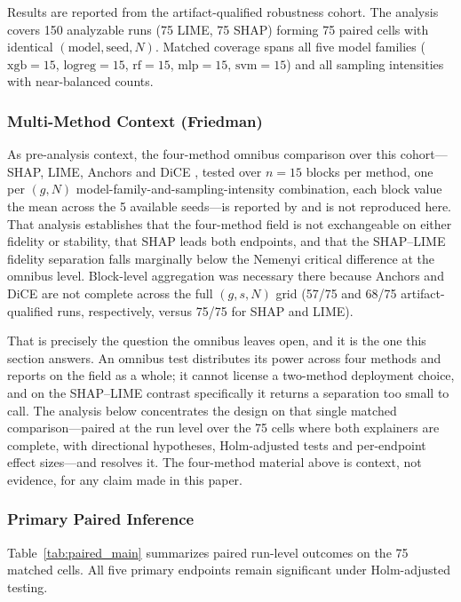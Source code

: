 \documentclass[fleqn,10pt,lineno]{wlpeerj}
\begin{document}
Results are reported from the artifact-qualified robustness cohort. The
analysis covers 150 analyzable runs (75 LIME, 75 SHAP) forming 75 paired
cells with identical $(\mathrm{model}, \mathrm{seed}, N)$. Matched
coverage spans all five model families ($\mathrm{xgb}=15$,
$\mathrm{logreg}=15$, $\mathrm{rf}=15$, $\mathrm{mlp}=15$,
$\mathrm{svm}=15$) and all sampling intensities with near-balanced counts.

\subsubsection*{Multi-Method Context (Friedman)}

As pre-analysis context, the four-method omnibus comparison over this
cohort---SHAP, LIME, Anchors \citep{ribeiro2018anchors} and DiCE
\citep{mothilal2020dice}, tested over $n=15$ blocks per method, one per
$(g,N)$ model-family-and-sampling-intensity combination, each block value
the mean across the 5 available seeds---is reported by
\citet{herrera2026framework} and is not reproduced here. That analysis
establishes that the four-method field is not exchangeable on either
fidelity or stability, that SHAP leads both endpoints, and that the
SHAP--LIME fidelity separation falls marginally below the Nemenyi critical
difference at the omnibus level. Block-level aggregation was necessary
there because Anchors and DiCE are not complete across the full $(g,s,N)$
grid (57/75 and 68/75 artifact-qualified runs, respectively, versus 75/75
for SHAP and LIME).

That is precisely the question the omnibus leaves open, and it is the one
this section answers. An omnibus test distributes its power across four
methods and reports on the field as a whole; it cannot license a
two-method deployment choice, and on the SHAP--LIME contrast specifically
it returns a separation too small to call. The analysis below concentrates
the design on that single matched comparison---paired at the run level over
the 75 cells where both explainers are complete, with directional
hypotheses, Holm-adjusted tests and per-endpoint effect sizes---and
resolves it. The four-method material above is context, not evidence, for
any claim made in this paper.

\subsubsection*{Primary Paired Inference}

Table~\ref{tab:paired_main} summarizes paired run-level outcomes on the
75 matched cells. All five primary endpoints remain significant under
Holm-adjusted testing.
\end{document}
